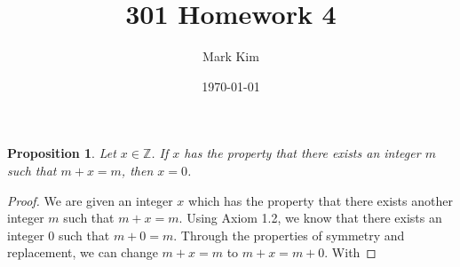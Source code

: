 \documentclass[12pt]{amsart}
\title{301 Homework 4}
\author{Mark Kim}
\date{\today}
\newcommand{\Z}{\mathbb{Z}}
\newtheorem*{proposition}{Proposition}
\begin{document}
\maketitle

\begin{proposition}
Let $x\in\Z$. If $x$ has the property that there exists an integer $m$ such that $m+x=m$, then $x=0$.
\end{proposition}

\begin{proof}
We are given an integer $x$ which has the property that there exists another integer $m$ such that $m+x=m$.  Using Axiom 1.2, we know that there exists an integer $0$ such that $m+0=m$.  Through the properties of symmetry and replacement, we can change $m+x=m$ to $m+x=m+0$.  With
\end{proof}
\end{document}

